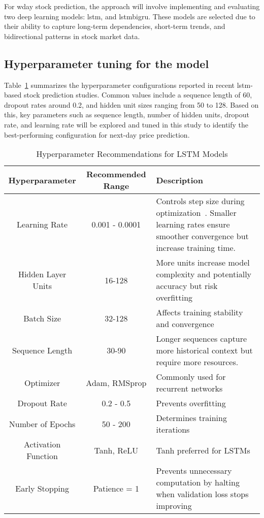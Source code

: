 For \acrshort{wday} stock prediction, the approach will involve implementing and evaluating 
two deep learning models: \acrshort{lstm}, and \acrshort{lstmbigru}.
These models are selected due to their ability to capture long-term dependencies, 
short-term trends, and bidirectional patterns in stock market data.

\subsection{Hyperparameter tuning for the model }

Table~\ref{tab:hyperparamsconf} summarizes the hyperparameter configurations 
reported in recent \acrshort{lstm}-based stock prediction studies. Common values include a 
sequence length of 60, dropout rates around 0.2, and hidden unit sizes ranging from 50 to 
128. Based on this, key parameters such as sequence length, number of hidden units, dropout
rate, and learning rate will be explored and tuned in this study to identify the 
best-performing configuration for next-day price prediction.

\begin{table}[H]
\centering
\caption{Hyperparameter Recommendations for LSTM Models}
\label{tab:hyperparamsconf}
\begin{tabular}{ccp{6.5cm}}
\hline
\textbf{Hyperparameter} & \textbf{Recommended Range} & \textbf{Description} \\ \hline\hline
Learning Rate & 0.001 - 0.0001 & Controls step size during optimization~\parencite{parmar2018stock}. 
Smaller learning rates ensure smoother convergence but increase training time.\\
Hidden Layer Units & 16-128 & More units increase model complexity and potentially accuracy but risk overfitting \\
Batch Size & 32-128 & Affects training stability and convergence \\
Sequence Length & 30-90 & Longer sequences capture more historical context but require more resources. \\
Optimizer & Adam, RMSprop & Commonly used for recurrent networks \\
Dropout Rate & 0.2 - 0.5 & Prevents overfitting~\parencite{agrawal2022StockPrediction} \\
Number of Epochs & 50 - 200 & Determines training iterations \\
Activation Function & Tanh, ReLU & Tanh preferred for LSTMs \\
Early Stopping & Patience = 1 & Prevents unnecessary computation by halting when validation loss 
stops improving~\parencite{chang2024StockPrediction} \\
\hline
\end{tabular}
\end{table}


